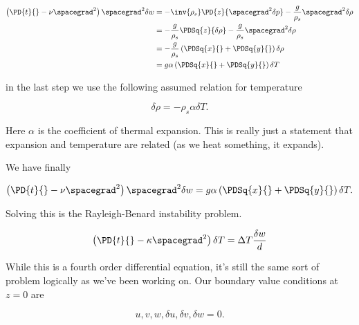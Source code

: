 \begin{align*}
\left( \PD{t}{} - \nu \spacegrad^2 \right) \spacegrad^2 \delta w 
&= -\inv{\rho_s} \PD{z}{ \spacegrad^2 \delta p} - \frac{g}{\rho_s} \spacegrad^2 \delta \rho \\
&= -\frac{g}{\rho_s} \PDSq{z}{\delta \rho} - \frac{g}{\rho_s} \spacegrad^2 \delta \rho \\
&= 
-\frac{g}{\rho_s} \left( 
\PDSq{x}{}
+\PDSq{y}{}
\right)
\delta \rho \\
&=
g \alpha \left( 
\PDSq{x}{}
+\PDSq{y}{}
\right)
\delta T
\end{align*}

in the last step we use the following assumed relation for temperature

\begin{equation}\label{eqn:continuumL21:250}
\delta \rho = - \rho_s \alpha \delta T.
\end{equation}

Here $\alpha$ is the coefficient of thermal expansion.  This is really just a statement that expansion and temperature are related (as we heat something, it expands).

We have finally

\begin{equation}\label{eqn:continuumL21:290}
\left( \PD{t}{} - \nu \spacegrad^2 \right) \spacegrad^2 \delta w 
= 
g \alpha \left( 
\PDSq{x}{}
+\PDSq{y}{}
\right)
\delta T.
\end{equation}

Solving this is the Rayleigh-Benard instability problem.

\begin{equation}\label{eqn:continuumL21:270}
\left( \PD{t}{} - \kappa \spacegrad^2 \right) \delta T = \Delta T \frac{\delta w}{d}
\end{equation}

While this is a fourth order differential equation, it's still the same sort of problem logically as we've been working on.  Our boundary value conditions at $z = 0$ are

\begin{equation}\label{eqn:continuumL21:n}
u, v, w, \delta u, \delta v, \delta w = 0.
\end{equation}


\EndNoBibArticle
